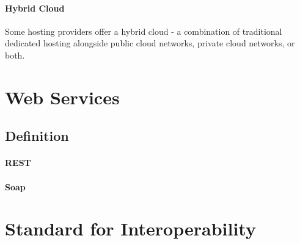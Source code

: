 \paragraph{Hybrid Cloud}
\label{paragraph:Hybrid Cloud}
Some hosting providers offer a hybrid cloud - a combination of traditional dedicated hosting alongside public cloud networks, private cloud networks, or both.

\section{Web Services}
\subsection{Definition}
\paragraph{REST}
\label{paragraph:REST}
\paragraph{Soap}
\label{paragraph:Soap}





\section{Standard for Interoperability}
